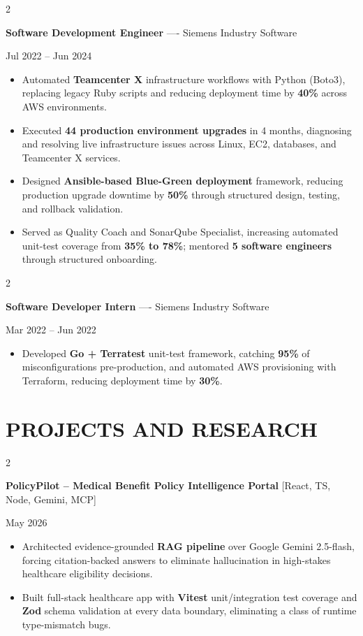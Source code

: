 \documentclass[10pt, letterpaper]{article}
\newenvironment{highlights}{
    \begin{itemize}[
        topsep=0.10 cm,
        parsep=0.06 cm,
        partopsep=0pt,
        itemsep=0.06 cm,
        leftmargin=12pt
    ]
}{
    \end{itemize}
}
\newenvironment{twocolentry}[2][]{
    \onecolentry
    \def\secondColumn{#2}
    \setcolumnwidth{\fill, 4.5 cm}
    \begin{paracol}{2}
}{
    \switchcolumn \raggedleft \secondColumn
    \end{paracol}
    \endonecolentry
}
\begin{document}
\vspace{0.15 cm}

\begin{twocolentry}{Jul 2022 -- Jun 2024}
\textbf{Software Development Engineer} ---- Siemens Industry Software
\end{twocolentry}
\begin{highlights}
  \item Automated \textbf{Teamcenter X} infrastructure workflows with Python (Boto3), replacing legacy Ruby scripts and reducing deployment time by \textbf{40\%} across AWS environments.
  \item Executed \textbf{44 production environment upgrades} in 4 months, diagnosing and resolving live infrastructure issues across Linux, EC2, databases, and Teamcenter X services.
  \item Designed \textbf{Ansible-based Blue-Green deployment} framework, reducing production upgrade downtime by \textbf{50\%} through structured design, testing, and rollback validation.
  \item Served as Quality Coach and SonarQube Specialist, increasing automated unit-test coverage from \textbf{35\% to 78\%}; mentored \textbf{5 software engineers} through structured onboarding.
\end{highlights}

\vspace{0.15 cm}

\begin{twocolentry}{Mar 2022 -- Jun 2022}
\textbf{Software Developer Intern} ---- Siemens Industry Software
\end{twocolentry}
\begin{highlights}
  \item Developed \textbf{Go + Terratest} unit-test framework, catching \textbf{95\%} of misconfigurations pre-production, and automated AWS provisioning with Terraform, reducing deployment time by \textbf{30\%}.
\end{highlights}

\section{PROJECTS AND RESEARCH}
\begin{twocolentry}{May 2026}
\textbf{PolicyPilot -- Medical Benefit Policy Intelligence Portal} [React, TS, Node, Gemini, MCP]
\end{twocolentry}
\begin{highlights}
  \item Architected evidence-grounded \textbf{RAG pipeline} over Google Gemini 2.5-flash, forcing citation-backed answers to eliminate hallucination in high-stakes healthcare eligibility decisions.
  \item Built full-stack healthcare app with \textbf{Vitest} unit/integration test coverage and \textbf{Zod} schema validation at every data boundary, eliminating a class of runtime type-mismatch bugs.
\end{highlights}
\end{document}
